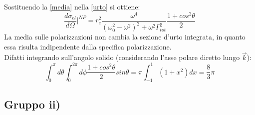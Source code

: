 \documentclass[twoside]{article}
\begin{document}
Sostituendo la \ref{media} nella \ref{urto} si ottiene:
\begin{equation}
    \frac{d\sigma_{el}}{d\Omega}\biggl|^{NP}=r_e^2\frac{\omega^4}{(\omega_0^2-\omega^2)^2+\omega^2\Gamma_{tot}^2}\frac{1+cos^2\theta}{2}
\end{equation}
La media sulle polarizzazioni non cambia la sezione d'urto integrata, in quanto essa risulta indipendente dalla specifica polarizzazione.\\
Difatti integrando sull'angolo solido (considerando l'asse polare diretto lungo $\vec{k}$):
\begin{equation}
    \int_0^\pi d\theta\int_0^{2\pi}d\phi \frac{1+cos^2\theta}{2}sin\theta=\pi\int_{-1}^{1}(1+x^2)dx=\frac{8}{3}\pi
\end{equation}








\subsection*{Gruppo ii)}
\end{document}
